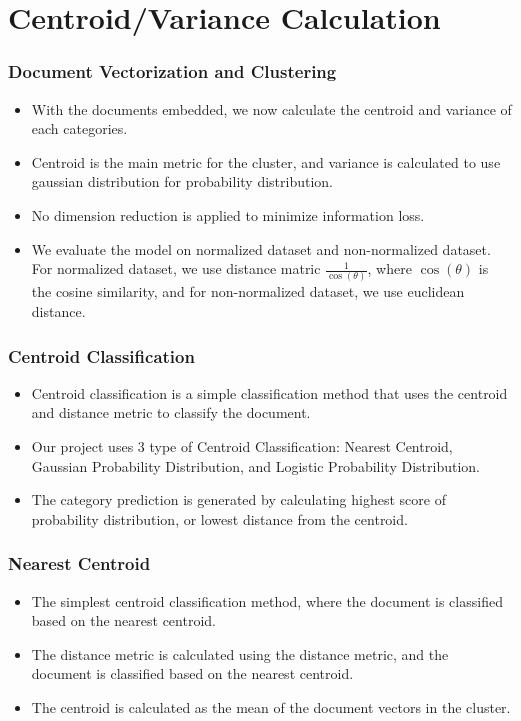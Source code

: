 \documentclass[
    10pt %
    16:9, %
]{beamer}
\begin{document}
\section{Centroid/Variance Calculation}
\begin{frame}
  \frametitle{Document Vectorization and Clustering}
  \begin{itemize}
    \item With the documents embedded, we now calculate the centroid and variance of each categories.
    \item Centroid is the main metric for the cluster, and variance is calculated to use gaussian distribution for probability distribution.
    \item No dimension reduction is applied to minimize information loss.
    \item We evaluate the model on normalized dataset and non-normalized dataset. For normalized dataset, we use distance matric $\frac{1}{\cos(\theta)}$, where $\cos(\theta)$ is the cosine similarity, and for non-normalized dataset, we use euclidean distance.
  \end{itemize}
\end{frame}

\begin{frame}
  \frametitle{Centroid Classification}
  \begin{itemize}
    \item Centroid classification is a simple classification method that uses the centroid and distance metric to classify the document.
    \item Our project uses 3 type of Centroid Classification: Nearest Centroid, Gaussian Probability Distribution, and Logistic Probability Distribution.
    \item The category prediction is generated by calculating highest score of probability distribution, or lowest distance from the centroid.
  \end{itemize}
\end{frame}

\begin{frame}
  \frametitle{Nearest Centroid}
  \begin{itemize}
    \item The simplest centroid classification method, where the document is classified based on the nearest centroid.
    \item The distance metric is calculated using the distance metric, and the document is classified based on the nearest centroid.
    \item The centroid is calculated as the mean of the document vectors in the cluster.
  \end{itemize}
\end{frame}
\end{document}
